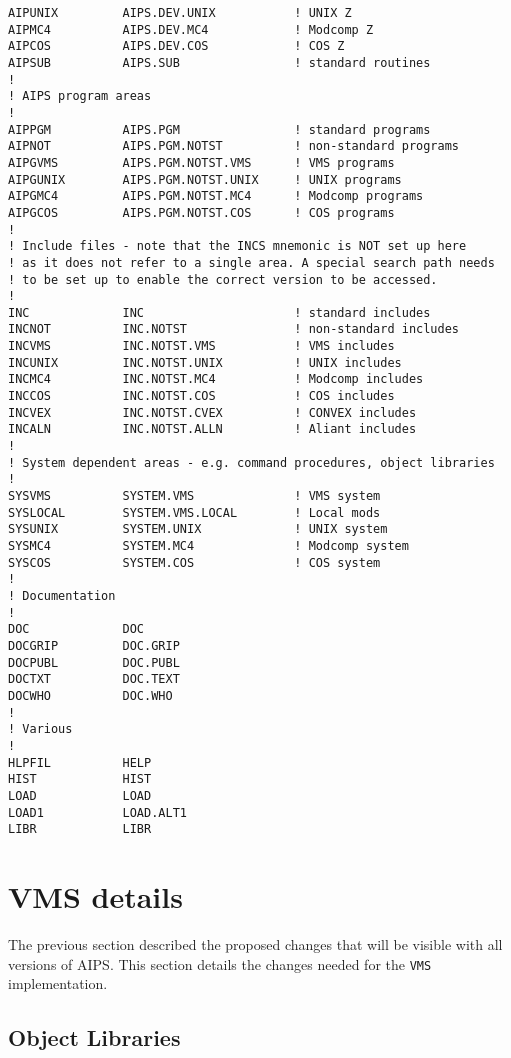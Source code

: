 \begin{verbatim}
AIPUNIX         AIPS.DEV.UNIX           ! UNIX Z
AIPMC4          AIPS.DEV.MC4            ! Modcomp Z
AIPCOS          AIPS.DEV.COS            ! COS Z
AIPSUB          AIPS.SUB                ! standard routines
!
! AIPS program areas
!
AIPPGM          AIPS.PGM                ! standard programs
AIPNOT          AIPS.PGM.NOTST          ! non-standard programs
AIPGVMS         AIPS.PGM.NOTST.VMS      ! VMS programs
AIPGUNIX        AIPS.PGM.NOTST.UNIX     ! UNIX programs
AIPGMC4         AIPS.PGM.NOTST.MC4      ! Modcomp programs
AIPGCOS         AIPS.PGM.NOTST.COS      ! COS programs
!
! Include files - note that the INCS mnemonic is NOT set up here
! as it does not refer to a single area. A special search path needs
! to be set up to enable the correct version to be accessed.
!
INC             INC                     ! standard includes
INCNOT          INC.NOTST               ! non-standard includes
INCVMS          INC.NOTST.VMS           ! VMS includes
INCUNIX         INC.NOTST.UNIX          ! UNIX includes
INCMC4          INC.NOTST.MC4           ! Modcomp includes
INCCOS          INC.NOTST.COS           ! COS includes
INCVEX          INC.NOTST.CVEX          ! CONVEX includes
INCALN          INC.NOTST.ALLN          ! Aliant includes
!
! System dependent areas - e.g. command procedures, object libraries
!
SYSVMS          SYSTEM.VMS              ! VMS system
SYSLOCAL        SYSTEM.VMS.LOCAL        ! Local mods
SYSUNIX         SYSTEM.UNIX             ! UNIX system
SYSMC4          SYSTEM.MC4              ! Modcomp system
SYSCOS          SYSTEM.COS              ! COS system
!
! Documentation
!
DOC             DOC
DOCGRIP         DOC.GRIP
DOCPUBL         DOC.PUBL
DOCTXT          DOC.TEXT
DOCWHO          DOC.WHO
!
! Various
!
HLPFIL          HELP
HIST            HIST
LOAD            LOAD
LOAD1           LOAD.ALT1
LIBR            LIBR
\end{verbatim}

\section{ VMS details }

The previous section described the proposed changes that will be visible
with all versions of AIPS. This section details the changes needed for
the {\tt VMS\/} implementation.

\subsection{ Object Libraries }

